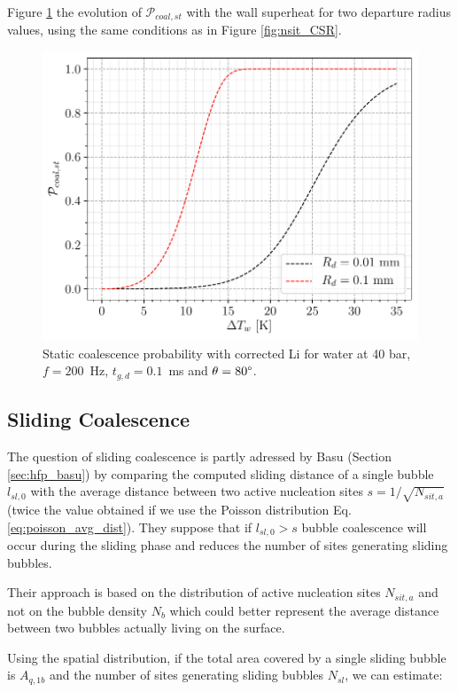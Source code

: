 Figure \ref{fig:pcoal_st} the evolution of $\mathcal{P}_{coal,st}$ with the wall superheat for two departure radius values, using the same conditions as in Figure \ref{fig:nsit_CSR}.

\begin{figure}[!h]
\centering
\includegraphics[width=0.6\linewidth]{img/site_interaction/P_coal_st.pdf}
\caption{Static coalescence probability with corrected Li \etal for water at 40 bar, $f=200$~Hz, $t_{g,d} = 0.1$~ms and $\theta=80\degree$.}
\label{fig:pcoal_st}
\end{figure}



\subsection{Sliding Coalescence}


The question of sliding coalescence is partly adressed by Basu \etal \cite{basu_wall_2005} (Section \ref{sec:hfp_basu}) by comparing the computed sliding distance of a single bubble $l_{sl,0}$ with the average distance between two active nucleation sites $s = 1 / \sqrt{N_{sit,a}}$ (twice the value obtained if we use the Poisson distribution Eq. \ref{eq:poisson_avg_dist}). They suppose that if $l_{sl,0} > s$ bubble coalescence will occur during the sliding phase and reduces the number of sites generating sliding bubbles.

\begin{remark*}{}
Their approach is based on the distribution of active nucleation sites $N_{sit,a}$ and not on the bubble density $N_{b}$ which could better represent the average distance between two bubbles actually living on the surface.
\end{remark*}


Using the spatial distribution, if the total area covered by a single sliding bubble is $A_{q,1b}$ and the number of sites generating sliding bubbles $N_{sl}$, we can estimate:

